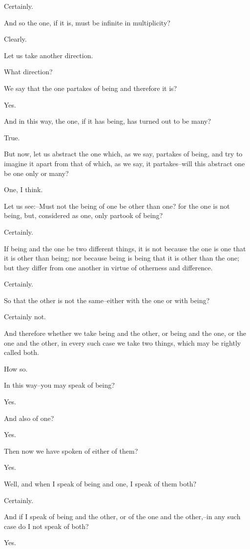 Certainly.

And so the one, if it is, must be infinite in multiplicity?

Clearly.

Let us take another direction.

What direction?

We say that the one partakes of being and therefore it is?

Yes.

And in this way, the one, if it has being, has turned out to be many?

True.

But now, let us abstract the one which, as we say, partakes of
being, and try to imagine it apart from that of which, as we say, it
partakes--will this abstract one be one only or many?

One, I think.

Let us see:--Must not the being of one be other than one? for the one is
not being, but, considered as one, only partook of being?

Certainly.

If being and the one be two different things, it is not because the one
is one that it is other than being; nor because being is being that it
is other than the one; but they differ from one another in virtue of
otherness and difference.

Certainly.

So that the other is not the same--either with the one or with being?

Certainly not.

And therefore whether we take being and the other, or being and the one,
or the one and the other, in every such case we take two things, which
may be rightly called both.

How so.

In this way--you may speak of being?

Yes.

And also of one?

Yes.

Then now we have spoken of either of them?

Yes.

Well, and when I speak of being and one, I speak of them both?

Certainly.

And if I speak of being and the other, or of the one and the other,--in
any such case do I not speak of both?

Yes.

